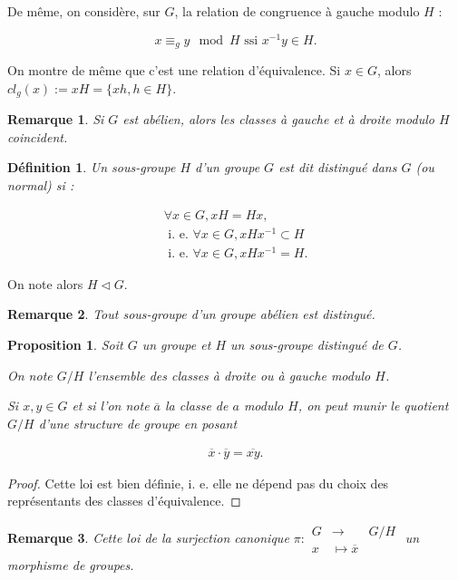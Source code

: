 \documentclass[french]{book}
\newtheorem{prop}{Proposition}[section]
\newtheorem{definition}{Définition}[section]
\newtheorem*{remark}{Remarque}
\begin{document}
De même, on considère, sur $G$,  la relation de congruence à gauche modulo $H$  :

\begin{equation*}
  x \equiv _{g} y \mod H \text{ ssi } x ^{-1} y \in H.
\end{equation*}

On montre de même que c'est une relation d'équivalence. Si $x \in G$, alors $cl_g(x) := xH = \{ xh, h \in H \} $.

\begin{remark}
  Si $G$ est abélien, alors les classes à gauche et à droite modulo $H$ coincident.
\end{remark}

\begin{definition}
  Un sous-groupe $H$ d'un groupe $G$ est dit distingué dans $G$ (ou normal) si :

  \begin{gather*}
    \forall  x \in G, xH = Hx, \\
    \text{ i. e. } \forall x \in G, x H x ^{-1}  \subset H \\
    \text{ i. e. } \forall x \in G, x H x ^{-1} =H.
  \end{gather*}
\end{definition}

On note alors $H \triangleleft G$.

\begin{remark}
  Tout sous-groupe d'un groupe abélien est distingué.
\end{remark}

\begin{prop}
  Soit $G$ un groupe et $H$ un sous-groupe distingué de $G$.

  On note $G/H$ l'ensemble des classes à droite ou à gauche modulo $H$.

  Si $x, y \in G$ et si l'on note $\overline{a} $ la classe de $a$ modulo $H$, on peut munir le quotient $G/H$ d'une structure de groupe en posant

  \begin{gather*}
    \overline{x} \cdot \overline{y} = \overline{xy}.
  \end{gather*}
\end{prop}

\begin{proof}
  Cette loi est bien définie, i. e. elle ne dépend pas du choix des représentants des classes d'équivalence.
\end{proof}

\begin{remark}
  Cette loi de la surjection canonique $\pi:
    \begin{array}{lll}
    G & \longrightarrow & G/H \\
    x & \longmapsto \overline{x}
    \end{array}$ un morphisme de groupes.
\end{remark}
\end{document}
